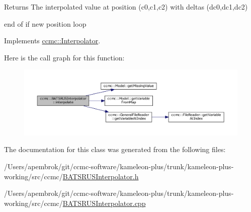 \begin{DoxyReturn}{Returns}
The interpolated value at position (c0,c1,c2) with deltas (dc0,dc1,dc2) 
\end{DoxyReturn}
end of if new position loop 

Implements \hyperlink{classccmc_1_1_interpolator_aa6b272bd53630020d92938ec1e5cfad9}{ccmc\-::\-Interpolator}.



Here is the call graph for this function\-:\nopagebreak
\begin{figure}[H]
\begin{center}
\leavevmode
\includegraphics[width=350pt]{classccmc_1_1_b_a_t_s_r_u_s_interpolator_a8bb4e9b10064a516192c771462673b09_cgraph}
\end{center}
\end{figure}




The documentation for this class was generated from the following files\-:\begin{DoxyCompactItemize}
\item 
/\-Users/apembrok/git/ccmc-\/software/kameleon-\/plus/trunk/kameleon-\/plus-\/working/src/ccmc/\hyperlink{_b_a_t_s_r_u_s_interpolator_8h}{B\-A\-T\-S\-R\-U\-S\-Interpolator.\-h}\item 
/\-Users/apembrok/git/ccmc-\/software/kameleon-\/plus/trunk/kameleon-\/plus-\/working/src/ccmc/\hyperlink{_b_a_t_s_r_u_s_interpolator_8cpp}{B\-A\-T\-S\-R\-U\-S\-Interpolator.\-cpp}\end{DoxyCompactItemize}

